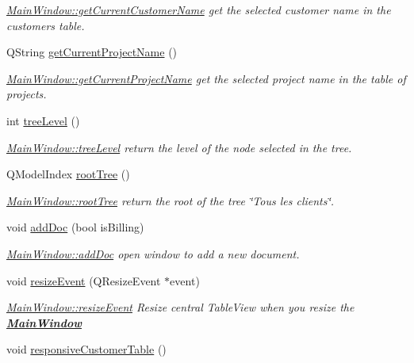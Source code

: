\begin{DoxyCompactItemize}
\begin{DoxyCompactList}\small\item\em \hyperlink{classGui_1_1MainWindow_a0303a1752424b1e8c1a6e1b0bba2a823}{Main\+Window\+::get\+Current\+Customer\+Name} get the selected customer name in the customers\textquotesingle{} table. \end{DoxyCompactList}\item 
Q\+String \hyperlink{classGui_1_1MainWindow_af83b009038b41bc676d15cb9bcfd5a39}{get\+Current\+Project\+Name} ()
\begin{DoxyCompactList}\small\item\em \hyperlink{classGui_1_1MainWindow_af83b009038b41bc676d15cb9bcfd5a39}{Main\+Window\+::get\+Current\+Project\+Name} get the selected project name in the table of projects. \end{DoxyCompactList}\item 
int \hyperlink{classGui_1_1MainWindow_a382370c8f119d99d409b1b5708a3e846}{tree\+Level} ()
\begin{DoxyCompactList}\small\item\em \hyperlink{classGui_1_1MainWindow_a382370c8f119d99d409b1b5708a3e846}{Main\+Window\+::tree\+Level} return the level of the node selected in the tree. \end{DoxyCompactList}\item 
Q\+Model\+Index \hyperlink{classGui_1_1MainWindow_ad2b58d18473d125b431ee0974c905748}{root\+Tree} ()
\begin{DoxyCompactList}\small\item\em \hyperlink{classGui_1_1MainWindow_ad2b58d18473d125b431ee0974c905748}{Main\+Window\+::root\+Tree} return the root of the tree \char`\"{}\+Tous les
clients\char`\"{}. \end{DoxyCompactList}\item 
void \hyperlink{classGui_1_1MainWindow_adf04c63032d4014163797ca73041511f}{add\+Doc} (bool is\+Billing)
\begin{DoxyCompactList}\small\item\em \hyperlink{classGui_1_1MainWindow_adf04c63032d4014163797ca73041511f}{Main\+Window\+::add\+Doc} open window to add a new document. \end{DoxyCompactList}\item 
void \hyperlink{classGui_1_1MainWindow_a7c85d2a0d68c046fa678bdc12feef96d}{resize\+Event} (Q\+Resize\+Event $\ast$event)
\begin{DoxyCompactList}\small\item\em \hyperlink{classGui_1_1MainWindow_a7c85d2a0d68c046fa678bdc12feef96d}{Main\+Window\+::resize\+Event} Resize central Table\+View when you resize the {\bfseries \hyperlink{classGui_1_1MainWindow}{Main\+Window}} \end{DoxyCompactList}\item 
\hypertarget{classGui_1_1MainWindow_a0bf829effb9cb3e42ba063335a15cf3d}{}void \hyperlink{classGui_1_1MainWindow_a0bf829effb9cb3e42ba063335a15cf3d}{responsive\+Customer\+Table} ()\label{classGui_1_1MainWindow_a0bf829effb9cb3e42ba063335a15cf3d}


\end{DoxyCompactItemize}

